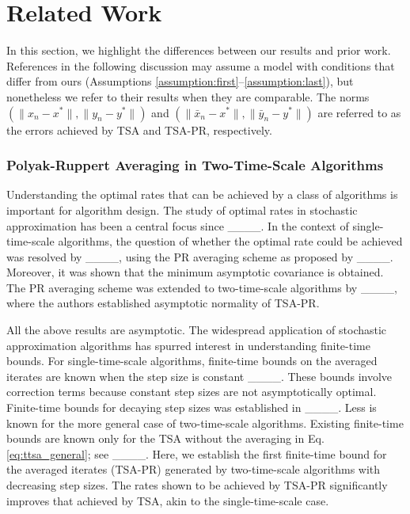 \section{Related Work}
\label{sec:literature}
In this section, we highlight the differences between our results and prior work.
References in the following discussion may assume a model with conditions that differ from ours (Assumptions \ref{assumption:first}--\ref{assumption:last}), but nonetheless we refer to their results when they are comparable. 
The norms $(\lVert x_n - x^* \rVert, \lVert y_n - y^* \rVert)$ and $(\lVert \bar{x}_n - x^* \rVert, \lVert \bar{y}_n - y^*\rVert)$ are referred to as the errors achieved by TSA and TSA-PR, respectively. 


\subsubsection{Polyak-Ruppert Averaging in Two-Time-Scale Algorithms}\label{sec:PR_TTSA}
Understanding the optimal rates that can be achieved by a class of algorithms is important for algorithm design. 
The study of optimal rates in stochastic approximation has been a central focus since ____. 
In the context of single-time-scale algorithms, the question of whether the optimal rate could be achieved was resolved by ____, using the PR averaging scheme as proposed by ____.
Moreover, it was shown that the minimum asymptotic covariance is obtained. 
The PR averaging scheme was extended to two-time-scale algorithms by ____, where the authors established asymptotic normality of TSA-PR.



All the above results are asymptotic. 
The widespread application of stochastic approximation algorithms has spurred interest in understanding finite-time bounds. 
For single-time-scale algorithms, finite-time bounds on the averaged iterates are known when the step size is constant ____.
These bounds involve correction terms because constant step sizes are not asymptotically optimal. 
Finite-time bounds for decaying step sizes was established in ____.
Less is known for the more general case of two-time-scale algorithms. 
Existing finite-time bounds are known only for the TSA without the averaging in Eq. \eqref{eq:ttsa_general}; see ____. 
Here, we establish the first finite-time bound for the averaged iterates (TSA-PR) generated by two-time-scale algorithms with decreasing step sizes. 
The rates shown to be achieved by TSA-PR significantly improves that achieved by TSA, akin to the single-time-scale case. 





